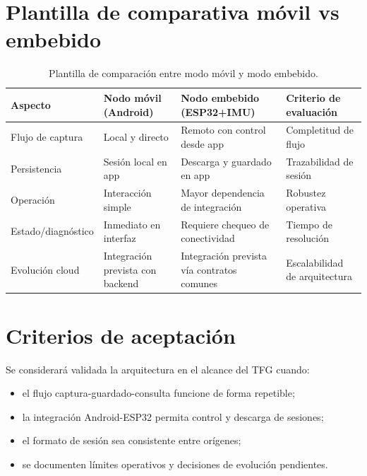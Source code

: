 \section{Plantilla de comparativa móvil vs embebido}

\begin{table}[htbp]
  \centering
  \small
  \setlength{\tabcolsep}{6pt}
  \renewcommand{\arraystretch}{1.2}
  \begin{tabularx}{\textwidth}{>{\raggedright\arraybackslash}p{} >{\raggedright\arraybackslash}X >{\raggedright\arraybackslash}X >{\raggedright\arraybackslash}p{}}
  \rowcolor{udcpink!25}
  \textbf{Aspecto} & \textbf{Nodo móvil (Android)} & \textbf{Nodo embebido (ESP32+IMU)} & \textbf{Criterio de evaluación} \\\hline
  Flujo de captura & Local y directo & Remoto con control desde app & Completitud de flujo \\
  Persistencia & Sesión local en app & Descarga y guardado en app & Trazabilidad de sesión \\
  Operación & Interacción simple & Mayor dependencia de integración & Robustez operativa \\
  Estado/diagnóstico & Inmediato en interfaz & Requiere chequeo de conectividad & Tiempo de resolución \\
  Evolución cloud & Integración prevista con backend & Integración prevista vía contratos comunes & Escalabilidad de arquitectura \\
  \end{tabularx}
  \caption{Plantilla de comparación entre modo móvil y modo embebido.}
  \label{tab:comparativa-plataformas}
\end{table}

\section{Criterios de aceptación}

Se considerará validada la arquitectura en el alcance del TFG cuando:

\begin{itemize}
  \item el flujo captura-guardado-consulta funcione de forma repetible;
  \item la integración Android-ESP32 permita control y descarga de sesiones;
  \item el formato de sesión sea consistente entre orígenes;
  \item se documenten límites operativos y decisiones de evolución pendientes.
\end{itemize}

